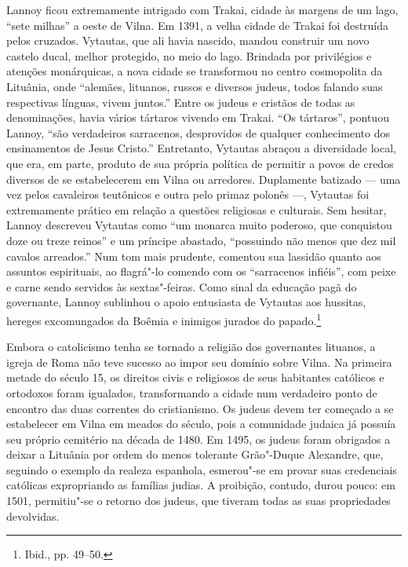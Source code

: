 Lannoy ficou extremamente intrigado com Trakai, cidade às margens de um
lago, ``sete milhas'' a oeste de Vilna. Em 1391, a velha cidade de
Trakai foi destruída pelos cruzados. Vytautas, que ali havia nascido,
mandou construir um novo castelo ducal, melhor protegido, no meio do
lago. Brindada por privilégios e atenções monárquicas, a nova cidade se
transformou no centro cosmopolita da Lituânia, onde ``alemães, lituanos,
russos e diversos judeus, todos falando suas respectivas línguas, vivem
juntos.'' Entre os judeus e cristãos de todas as denominações, havia
vários tártaros vivendo em Trakai. ``Os tártaros'', pontuou Lannoy,
``são verdadeiros sarracenos, desprovidos de qualquer conhecimento dos
ensinamentos de Jesus Cristo.'' Entretanto, Vytautas abraçou a
diversidade local, que era, em parte, produto de sua própria política de
permitir a povos de credos diversos de se estabelecerem em Vilna ou
arredores. Duplamente batizado --- uma vez pelos cavaleiros teutônicos e
outra pelo primaz polonês ---, Vytautas foi extremamente prático em
relação a questões religiosas e culturais. Sem hesitar, Lannoy descreveu
Vytautas como ``um monarca muito poderoso, que conquistou doze ou treze
reinos'' e um príncipe abastado, ``possuindo não menos que dez mil
cavalos arreados.'' Num tom mais prudente, comentou sua lassidão quanto
aos assuntos espirituais, ao flagrá"-lo comendo com os ``sarracenos
infiéis'', com peixe e carne sendo servidos às sextas"-feiras. Como sinal
da educação pagã do governante, Lannoy sublinhou o apoio entusiasta de
Vytautas aos hussitas, hereges excomungados da Boêmia e inimigos jurados
do papado.\footnote{Ibid., pp. 49--50.}

\asterisc

Embora o catolicismo tenha se tornado a religião dos governantes
lituanos, a igreja de Roma não teve sucesso ao impor seu domínio sobre
Vilna. Na primeira metade do século 15, os direitos civis e religiosos
de seus habitantes católicos e ortodoxos foram igualados, transformando
a cidade num verdadeiro ponto de encontro das duas correntes do
cristianismo. Os judeus devem ter começado a se estabelecer em Vilna em
meados do século, pois a comunidade judaica já possuía seu próprio
cemitério na década de 1480. Em 1495, os judeus foram obrigados a deixar
a Lituânia por ordem do menos tolerante Grão"-Duque Alexandre, que,
seguindo o exemplo da realeza espanhola, esmerou"-se em provar suas
credenciais católicas expropriando as famílias judias. A proibição,
contudo, durou pouco: em 1501, permitiu"-se o retorno dos judeus, que
tiveram todas as suas propriedades devolvidas.


